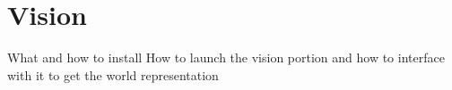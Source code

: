 \section{Vision}
What and how to install
How to launch the vision portion and how to interface with it to get the world representation